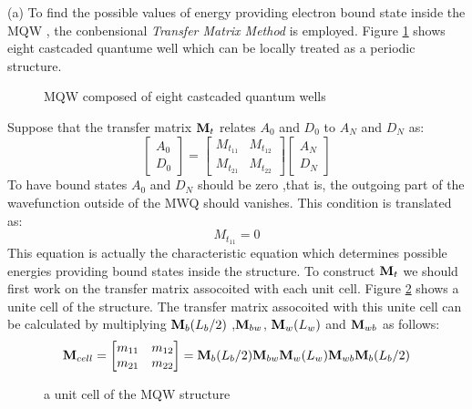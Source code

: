 \begin{homeworkProblem}
\begin{homeworkSection}{(a)}
To find the possible values of energy providing electron bound state  inside the MQW , the conbensional \textit{Transfer Matrix Method} is employed. Figure \ref{fig-MQW} shows eight castcaded quantume well which can be locally treated as a periodic structure. 
\begin{figure}[h]
\centering

\caption {MQW composed of eight castcaded quantum wells}
\label{fig-MQW}
\end{figure}

Suppose that the transfer matrix $\mathbf{M}_t$ relates $A_0$ and $D_0$ to $A_N$ and $D_N$ as:
\begin{equation}
\begin{bmatrix}
A_0\\
D_0
\end{bmatrix}
=
\begin{bmatrix}
M_{t}_{11} & M_{t}_{12}\\
M_{t}_{21}& M_{t}_{22}
\end{bmatrix}
\begin{bmatrix}
A_N\\
D_N
\end{bmatrix}
\end{equation}
To have bound states $A_0$ and $D_N$ should be zero ,that is, the outgoing part of the wavefunction outside of the MWQ should vanishes. This condition is translated as:
\begin{equation}\label{P3-1}
M_{t}_{11}=0
\end{equation}   
This equation is actually the characteristic equation which determines possible energies providing bound states inside the structure. To construct $\mathbf{M}_t$ we should first work on the transfer matrix assocoited with each unit cell. Figure \ref{fig-cell} shows a unite cell of the structure. The transfer matrix assocoited with this unite cell can be calculated by multiplying $\mathbf{M}_b(L_b/2)$ ,$\mathbf{M}_{bw}$, $\mathbf{M}_{w}(L_w)$ and $\mathbf{M}_{wb}$ as follows:
\begin{equation}
\mathbf{M}_{cell}=
\begin{bmatrix}\label{M_c}
m_{11} & m_{12}\\
m_{21} & m_{22}
\end{bmatrix}
=\mathbf{M}_{b}(L_b/2)\mathbf{M}_{bw}\mathbf{M}_{w}(L_w)\mathbf{M}_{wb}\mathbf{M}_{b}(L_b/2)
\end{equation}
\begin{figure}[h]
\centering

\caption{a unit cell of the MQW structure}
\label{fig-cell}
\end{figure}



\end{homeworkSection}
\end{homeworkProblem}
